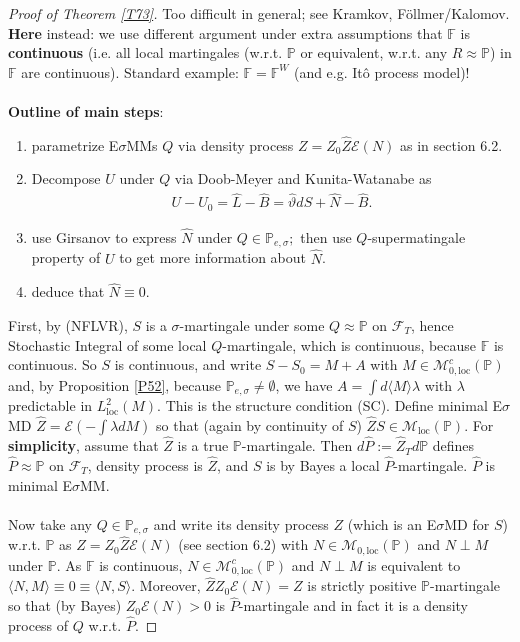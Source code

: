 \documentclass[12pt,a4paper, twoside]{article}
\theoremstyle{definition}
\newcommand{\PP}{\mathbb{P}} %
\begin{document}
\begin{proof}[Proof of Theorem \ref{T73}] Too difficult in general; see Kramkov, Föllmer/Kalomov. \textbf{Here} instead: we use different argument under extra assumptions that $\mathbb{F}$ is \textbf{continuous} (i.e. all local martingales (w.r.t. $\PP$ or equivalent, w.r.t. any $R \approx \PP$) in $\mathbb{F}$ are continuous). Standard example: $\mathbb{F}= \mathbb{F}^W$ (and e.g. Itô process model)!
\\\\
\textbf{Outline of main steps}:
\begin{enumerate}[label=(\alph*)]
\item parametrize E$\sigma$MMs $Q$ via density process $Z=Z_0 \hat{Z} \mathcal{E}(N)$ as in section 6.2.
\item Decompose $U$ under $Q$ via Doob-Meyer and Kunita-Watanabe as 
\begin{align*}
U-U_0 = \hat{L}- \hat{B} = \hat{\vartheta} dS + \hat{N} - \hat{B}.
\end{align*}
\item use Girsanov to express $\hat{N}$ under $Q \in \PP_{e, \sigma};$ then use $Q$-supermatingale property of $U$ to get more information about $\hat{N}$.
\item deduce that $\hat{N} \equiv 0$. 
\end{enumerate}
First, by (NFLVR), $S$ is a $\sigma$-martingale under some $Q \approx \PP$ on $\mathcal{F}_T$, hence Stochastic Integral of some local $Q$-martingale, which is continuous, because $\mathbb{F}$ is continuous. So $S$ is continuous, and write $S-S_0 = M + A$ with $M \in \mathcal{M}_{0, \text{loc}}^c( \PP)$ and, by Proposition \ref{P52}, because $\PP_{e, \sigma} \neq \emptyset$, we have $A = \int d \langle M \rangle \lambda$ with $\lambda$ predictable in $L_\text{loc}^2(M)$. This is the structure condition (SC).
\newpage
Define minimal E$\sigma$MD $\hat{Z}= \mathcal{E}(- \int \lambda dM)$ so that (again by continuity of $S$) $\hat{Z}S \in \mathcal{M}_\text{loc}( \PP)$. For \textbf{simplicity}, assume that $\hat{Z}$ is a true $\PP$-martingale. Then $d \hat{P}:= \hat{Z}_T d \PP$ defines $\hat{P} \approx \PP$ on $\mathcal{F}_T$, density process is $\hat{Z}$, and $S$ is by Bayes a local $\hat{P}$-martingale. $\hat{P}$ is minimal E$\sigma$MM.   
\\\\
Now take any $Q \in \PP_{e, \sigma}$ and write its density process $Z$ (which is an E$\sigma$MD for $S$) w.r.t. $\PP$ as $Z= Z_0 \hat{Z} \mathcal{E}(N)$ (see section 6.2) with $N \in \mathcal{M}_{0, \text{loc}}( \PP)$ and $N \perp M$ under $\PP$. As $\mathbb{F}$ is continuous, $N \in \mathcal{M}_{0, \text{loc}}^c( \PP)$ and $N \perp M$ is equivalent to $\langle N, M \rangle \equiv 0 \equiv \langle N, S\rangle.$  Moreover, $\hat{Z} Z_0 \mathcal{E}(N) = Z$ is strictly positive $\PP$-martingale so that (by Bayes) $Z_0 \mathcal{E}(N) >0$ is $\hat{P}$-martingale and in fact it is a density process of $Q$ w.r.t. $\hat{P}$. 

\end{proof}
\end{document}
